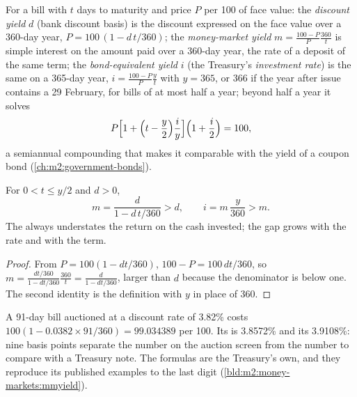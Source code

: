 \begin{definition}\label{def:m2:money-markets:yields}
For a bill with $t$ days to maturity and price $P$ per 100 of face value:
the \emph{discount yield} $d$ (bank discount basis) is
the discount expressed on the face value over a 360-day year,
$P = 100\,(1 - d\,t/360)$; the \emph{money-market yield} $m = \frac{100 - P}{P}\frac{360}{t}$ is simple interest on the amount
paid over a 360-day year, the rate of a deposit of the same term; the
\emph{bond-equivalent yield} $i$ (the Treasury's
\emph{investment rate}) is the same on a 365-day year, $i = \frac{100 -
P}{P}\frac{y}{t}$ with $y = 365$, or 366 if the year after issue contains a
29 February, for bills of at most half a year; beyond half a year it solves
\[
P\Bigl[1 + \Bigl(t - \frac y2\Bigr)\frac{i}{y}\Bigr]\Bigl(1 + \frac i2\Bigr) = 100,
\]
a semiannual compounding that makes it comparable with the yield of a coupon
bond (\cref{ch:m2:government-bonds}).
\end{definition}

\begin{proposition}\label{prop:m2:money-markets:order}
For $0 < t \le y/2$ and $d > 0$,
\[
m = \frac{d}{1 - d\,t/360} > d, \qquad i = m\,\frac{y}{360} > m .
\]
The  always understates the return on the cash invested; the
gap grows with the rate and with the term.
\end{proposition}
\begin{proof}
From $P = 100(1 - dt/360)$, $100 - P = 100\,dt/360$, so $m = \frac{dt/360}{1 -
dt/360}\frac{360}{t} = \frac{d}{1 - dt/360}$, larger than $d$ because the
denominator is below one. The second identity is the definition with $y$ in
place of 360.
\end{proof}

\begin{example}\label{ex:m2:money-markets:13w}
A 91-day bill auctioned at a discount rate of 3.82\% costs
$100(1 - 0.0382 \times 91/360) = 99.034389$ per 100. Its  is
3.8572\% and its  3.9108\%: nine basis points separate
the number on the auction screen from the number to compare with a
Treasury note. The formulas are the Treasury's own, and they reproduce its
published examples to the last digit (\cref{bld:m2:money-markets:mmyield}).
\end{example}

